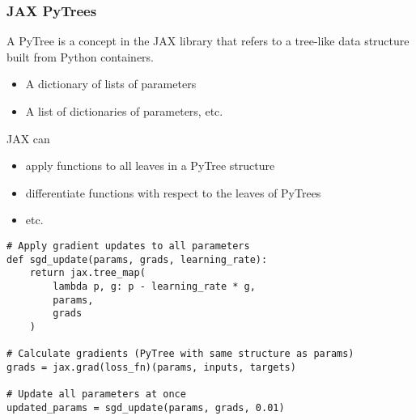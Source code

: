 \begin{frame}
    \frametitle{JAX PyTrees}

    A PyTree is a concept in the JAX library that refers to a tree-like data structure built from Python containers.

    \Egs

    \begin{itemize}
        \item A dictionary of lists of parameters
        \item A list of dictionaries of parameters, etc.
    \end{itemize}

    JAX can

    \begin{itemize}
        \item apply functions to all leaves in a PyTree structure
        \item differentiate functions with respect to the leaves of PyTrees
        \item etc.
    \end{itemize}

\end{frame}


\begin{frame}
    
    
    \resizebox{1.0\textwidth}{!}{
        
    }

\end{frame}


\begin{frame}[fragile]
    
    \begin{verbatim}
# Apply gradient updates to all parameters
def sgd_update(params, grads, learning_rate):
    return jax.tree_map(
        lambda p, g: p - learning_rate * g, 
        params, 
        grads
    )

# Calculate gradients (PyTree with same structure as params)
grads = jax.grad(loss_fn)(params, inputs, targets)

# Update all parameters at once
updated_params = sgd_update(params, grads, 0.01)    
    \end{verbatim}

\end{frame}


